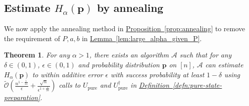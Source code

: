\documentclass[journal]{IEEEtran}
\newtheorem{theorem}{Theorem}
\newcommand{\defn}[1]{\hyperref[defn:#1]{Definition~\ref*{defn:#1}}}
\newcommand{\lem}[1]{\hyperref[lem:#1]{Lemma~\ref*{lem:#1}}}
\newcommand{\prop}[1]{\hyperref[prop:#1]{Proposition~\ref*{prop:#1}}}
\begin{document}
\subsection{Estimate $H_{\alpha}(\mathbf{p})$ by annealing}
\noindent
We now apply the annealing method in \prop{annealing} to remove the requirement of $P,a,b$ in \lem{large_alpha_given_P}.
\begin{theorem}\label{thm:main-alpha-large}
  For any $\alpha > 1$, there exists an algorithm $\mathcal{A}$ such that for any $\delta \in (0,1)$, $\epsilon\in(0,1)$ and probability distribution $\mathbf{p}$ on $[n]$, $\mathcal{A}$ can estimate $H_{\alpha}(\mathbf{p})$ to within additive error $\epsilon$
  with success probability at least $1-\delta$ using $ \widetilde{\mathcal{O}}\left(\frac{n^{1-\frac{1}{2\alpha}}}{\epsilon} + \frac{\sqrt{n}}{\epsilon^{1+\frac{1}{2\alpha}}}\right)$ calls to $U_{\mathrm{pure}}$ and $U_{\mathrm{pure}}^{\dagger}$ in \defn{pure-state-preparation}.
\end{theorem}
\end{document}
